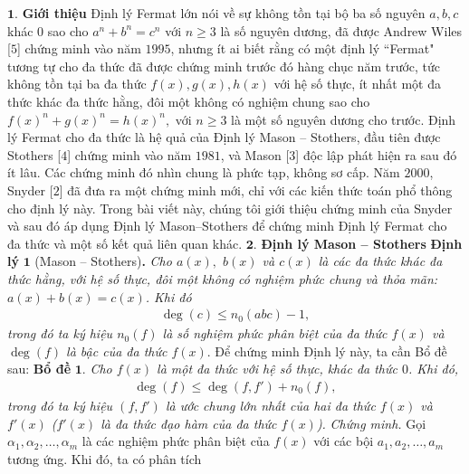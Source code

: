 \vspace*{160pt}

\begin{multicols}{2}
$\pmb{1.}$ \textbf{\color{hoccungpi}Giới thiệu}
\vskip 0.1cm
Định lý Fermat lớn nói về sự không tồn tại bộ ba số nguyên $a,b,c$ khác $0$ sao cho $a^n+b^n=c^n$ với $n\ge 3$ là số nguyên dương, đã được Andrew Wiles [$5$] chứng minh vào năm $1995$, nhưng ít ai biết rằng có một định lý ``Fermat" tương tự cho đa thức đã được chứng minh trước đó hàng chục năm trước, tức không tồn tại ba đa thức $f(x),g(x),h(x)$ với hệ số thực, ít nhất một đa thức khác đa thức hằng, đôi một không có nghiệm chung sao cho $f(x)^n+g(x)^n=h(x)^n,$ với $ n\ge 3$ là một số nguyên dương cho trước.
\vskip 0.1cm
Định lý Fermat cho đa thức là hệ quả của Định lý Mason -- Stothers, đầu tiên được Stothers [$4$] chứng minh vào năm $1981$, và Mason [$3$] độc lập phát hiện ra sau đó ít lâu. Các chứng minh đó nhìn chung là phức tạp, không sơ cấp. Năm $2000$, Snyder [$2$] đã đưa ra một chứng minh mới, chỉ với các kiến thức toán phổ thông cho định lý này. Trong bài viết này, chúng tôi giới thiệu chứng minh của Snyder và sau đó áp dụng Định lý Mason--Stothers để chứng minh Định lý Fermat cho đa thức và một số kết quả liên quan khác.
\vskip 0.1cm 
$\pmb{2. }$ \textbf{\color{hoccungpi}Định lý Mason -- Stothers}
\vskip 0.1cm
	\textbf{\color{hoccungpi}Định lý} $\pmb{1}$ (Mason -- Stothers)\textbf{\color{hoccungpi}.} 
\textit{	Cho $a(x),$ $b(x)$ và $c(x)$ là các đa thức khác đa thức hằng, với hệ số thực, đôi một không có nghiệm phức chung và thỏa mãn: $a(x) + b(x) = c(x)$. Khi đó
	\begin{align*}
		\deg(c) \le n_0{(abc)} - 1,
	\end{align*}
	trong đó ta ký hiệu $n_0(f)$ là số nghiệm phức phân biệt của đa thức $f(x)$ và $\deg(f)$ là bậc của đa thức $f(x).$}
	\vskip 0.1cm
	Để chứng minh Định lý này, ta cần Bổ đề sau:
	\vskip 0.1cm
	\textbf{\color{hoccungpi}Bổ đề} $\pmb{1.}$
	\textit{Cho $f(x)$ là một đa thức với hệ số thực, khác đa thức $0$.  Khi đó,
	\begin{align*}
		\deg(f) \le \deg(f,f') + n_0(f),
	\end{align*}
	trong đó ta ký hiệu $(f,f')$ là ước chung lớn nhất của hai đa thức $f(x)$ và $f'(x)$ ($f'(x)$ là đa thức đạo hàm của đa thức $f(x)$).} 
	\vskip 0.1cm
	\textit{Chứng minh.}
	Gọi $\alpha_1, \alpha_2, \ldots,  \alpha_m $ là các nghiệm phức phân biệt của $f(x)$ với các bội $a_1, a_2, \ldots , a_m$ tương ứng. Khi đó, ta có phân tích
	\begin{align*}

\end{align*}
\end{multicols}
